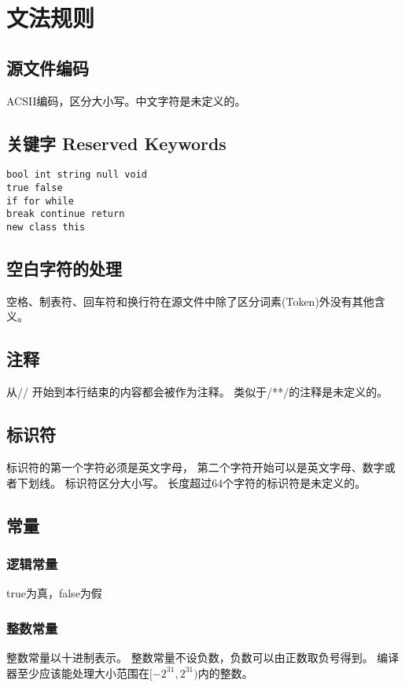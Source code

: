 \documentclass[twocolumn]{article}
\begin{document}
\section{文法规则}

\subsection{源文件编码}
ACSII编码，区分大小写。中文字符是未定义的。

\subsection{关键字 Reserved Keywords}
\begin{verbatim}
bool int string null void
true false
if for while
break continue return
new class this
\end{verbatim}
\subsection{空白字符的处理}

空格、制表符、回车符和换行符在源文件中除了区分词素(Token)外没有其他含义。

\subsection{注释}
从// 开始到本行结束的内容都会被作为注释。
类似于/**/的注释是未定义的。

\subsection{标识符}

标识符的第一个字符必须是英文字母，
第二个字符开始可以是英文字母、数字或者下划线。
标识符区分大小写。
长度超过64个字符的标识符是未定义的。

\subsection{常量}

\subsubsection{逻辑常量}
true为真，false为假

\subsubsection{整数常量}
整数常量以十进制表示。
整数常量不设负数，负数可以由正数取负号得到。
编译器至少应该能处理大小范围在$[-2^{31},2^{31})$内的整数。
\end{document}
